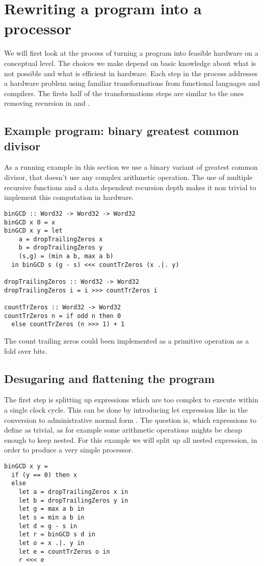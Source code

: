 \documentclass[preprint]{sigplanconf}
\begin{document}
\section{Rewriting a program into a processor}
We will first look at the process of turning a program into feasible hardware on a conceptual level.
The choices we make depend on basic knowledge about what is not possible and what is efficient in hardware.
Each step in the process addresses a hardware problem using familiar transformations from functional languages and compilers.
The firsts half of the transformations steps are similar to the ones removing recursion in \cite{Zhai} and \cite{Ingmar}.


\subsection{Example program: binary greatest common divisor}
As a running example in this section we use a binary variant of greatest common divisor, that doesn't use any complex arithmetic operation.
The use of multiple recursive functions and a data dependent recursion depth makes it non trivial to implement this computation in hardware.
\begin{lstlisting}
binGCD :: Word32 -> Word32 -> Word32       
binGCD x 0 = x
binGCD x y = let
    a = dropTrailingZeros x
    b = dropTrailingZeros y
    (s,g) = (min a b, max a b)
  in binGCD s (g - s) <<< countTrZeros (x .|. y)

dropTrailingZeros :: Word32 -> Word32
dropTrailingZeros i = i >>> countTrZeros i

countTrZeros :: Word32 -> Word32
countTrZeros n = if odd n then 0 
  else countTrZeros (n >>> 1) + 1
\end{lstlisting}
The count trailing zeros could been implemented as a primitive operation as a fold over bits.

\subsection{Desugaring and flattening the program}
The first step is splitting up expressions which are too complex to execute within a single clock cycle.
This can be done by introducing let expression like in the conversion to administrative normal form \cite{ANF}.
The question is, which expressions to define as trivial, as for example some arithmetic operations mights be cheap enough to keep nested.
For this example we will split up all nested expression, in order to produce a very simple processor.
\begin{lstlisting}
binGCD x y = 
  if (y == 0) then x
  else
    let a = dropTrailingZeros x in
    let b = dropTrailingZeros y in
    let g = max a b in
    let s = min a b in
    let d = g - s in
    let r = binGCD s d in
    let o = x .|. y in
    let e = countTrZeros o in
    r <<< e
\end{lstlisting}
\end{document}
